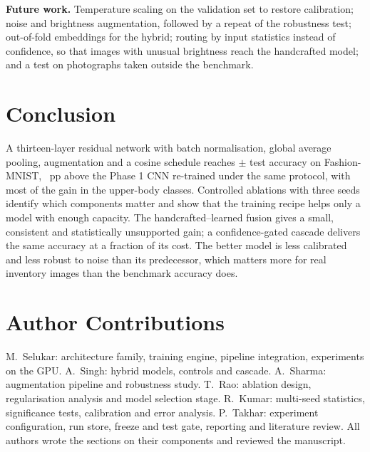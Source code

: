 \textbf{Future work.} Temperature scaling on the validation set to restore calibration; noise and brightness
augmentation, followed by a repeat of the robustness test; out-of-fold embeddings for the hybrid; routing by input
statistics instead of confidence, so that images with unusual brightness reach the handcrafted model; and a test on
photographs taken outside the benchmark.

\section{Conclusion}
\label{sec:p2conclusion}
A thirteen-layer residual network with batch normalisation, global average pooling, augmentation and a cosine
schedule reaches \TestFinal{} $\pm$ \TestFinalStd{} test accuracy on Fashion-MNIST, \TestGainFinalVsPone{}~pp above
the Phase 1 CNN re-trained under the same protocol, with most of the gain in the upper-body classes. Controlled
ablations with three seeds identify which components matter and show that the training recipe helps only a model
with enough capacity. The handcrafted--learned fusion gives a small, consistent and statistically unsupported gain;
a confidence-gated cascade delivers the same accuracy at a fraction of its cost. The better model is less
calibrated and less robust to noise than its predecessor, which matters more for real inventory images than the
benchmark accuracy does.

\section*{Author Contributions}
M.~Selukar: architecture family, training engine, pipeline integration, experiments on the GPU.
A.~Singh: hybrid models, controls and cascade.
A.~Sharma: augmentation pipeline and robustness study.
T.~Rao: ablation design, regularisation analysis and model selection stage.
R.~Kumar: multi-seed statistics, significance tests, calibration and error analysis.
P.~Takhar: experiment configuration, run store, freeze and test gate, reporting and literature review.
All authors wrote the sections on their components and reviewed the manuscript.
